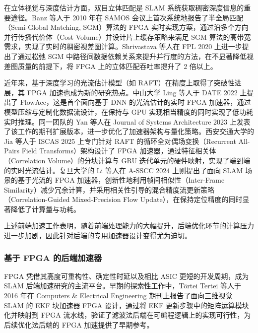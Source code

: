 在立体视觉与深度估计方面，双目立体匹配是 SLAM 系统获取稠密深度信息的重要途径。Banz 等人\cite{banz2010sgm}于 2010 年在 SAMOS 会议上首次系统地报告了半全局匹配（Semi-Global Matching, SGM）算法的 FPGA 实时实现方案，通过沿多个方向并行传播代价体（Cost Volume）并设计片上缓存策略来满足 SGM 算法的高带宽需求，实现了实时的稠密视差图计算。Shrivastava 等人\cite{shrivastava2020sgm}在 FPL 2020 上进一步提出了通过松弛 SGM 中路径间数据依赖关系来提升并行度的方法，在不显著降低视差图质量的前提下，将 FPGA 上的立体匹配吞吐率提升了 2 倍以上。

近年来，基于深度学习的光流估计模型（如 RAFT\cite{teed2020raft}）在精度上取得了突破性进展，其 FPGA 加速也成为新的研究热点。中山大学 Ling 等人\cite{ling2022flowacc}于 DATE 2022 上提出了 FlowAcc，这是首个面向基于 DNN 的光流估计的实时 FPGA 加速器，通过模型压缩与定制化数据流设计，在保持与 GPU 实现相当精度的同时实现了低功耗实时推理。同一团队的 Yan 等人\cite{yan2023optflow}在 Journal of Systems Architecture 2023 上发表了该工作的期刊扩展版本，进一步优化了加速器架构与量化策略。西安交通大学的 Jia 等人\cite{jia2025raft_fpga}于 ISCAS 2025 上专门针对 RAFT 的循环全对偶场变换（Recurrent All-Pairs Field Transforms）架构设计了 FPGA 加速器，通过特征相关体（Correlation Volume）的分块计算与 GRU 迭代单元的硬件映射，实现了端到端的实时光流估计。复旦大学的 Li 等人\cite{li2024optflow_slam}在 A-SSCC 2024 上则提出了面向 SLAM 场景的基于光流的 FPGA 加速器，创新性地利用帧间相似性（Inter-Frame Similarity）减少冗余计算，并采用相关性引导的混合精度流更新策略（Correlation-Guided Mixed-Precision Flow Update），在保持定位精度的同时显著降低了计算量与功耗。

上述前端加速工作表明，随着前端处理能力的大幅提升，后端优化环节的计算压力进一步加剧，因此针对后端的专用加速器设计变得尤为迫切。

\subsubsection{基于 FPGA 的后端加速器}

FPGA 凭借其高度可重构性、确定性时延以及相比 ASIC 更短的开发周期，成为 SLAM 后端加速研究的主流平台。早期的探索性工作中，T{\"o}rtei Tertei 等人\cite{tertei2016ekf_fpga}于 2016 年在 Computers \& Electrical Engineering 期刊上报告了面向三维视觉 SLAM 的 EKF 块加速器 FPGA 设计，通过将 EKF 更新步骤中的矩阵运算模块化并映射到 FPGA 流水线，验证了滤波法后端在可编程逻辑上的实现可行性，为后续优化法后端的 FPGA 加速提供了早期参考。

